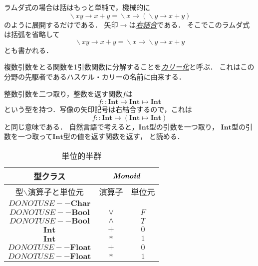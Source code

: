 \documentclass[a5paper,draft]{jsbook}
\newcommand{\keyword}[1]{{\underline{\emph{#1}}}}
\newcommand{\mathTypeParameter}[1]{\mathbf{#1}}
\newcommand{\mathTypeName}[1]{\mathbf{#1}}
\newcommand{\mathTypeClass}[1]{\textbf{\emph{#1}}} %
\DeclareMathOperator{\mathLambda}{\backslash}
\newcommand{\mathIn}{\mathrel{::}}
\newcommand{\mathLambdaArrow}{\rightarrow}
\newcommand{\mathMapsTo}{\mapsto}
\newcommand{\mathLambdaExpression}[2]{\mathLambda#1\mathLambdaArrow#2}
\newcommand{\mathMorphII}[3]{#1\mathMapsTo#2\mathMapsTo#3}
\newcommand{\mathMorphIIWithParenthesis}[3]{#1\mathMapsTo(#2\mathMapsTo#3)}
\newcommand{\hsklBool}{{DO NOT USE}--\mathTypeParameter{Bool}}
\newcommand{\hsklChar}{{DO NOT USE}--\mathTypeParameter{Char}}
\newcommand{\hsklFloat}{{DO NOT USE}--\mathTypeParameter{Float}}
\begin{document}
ラムダ式の場合は話はもっと単純で，機械的に
\begin{equation}
\mathLambdaExpression{xy}{x+y}
=\mathLambdaExpression{x}{\left(\mathLambdaExpression{y}{x+y}\right)}
\end{equation}
のように展開するだけである．
矢印$\mathLambdaArrow$は\keyword{右結合}である．
そこでこのラムダ式は括弧を省略して
\begin{equation}
\mathLambdaExpression{xy}{x+y}=\mathLambdaExpression{x}{\mathLambdaExpression{y}{x+y}}
\end{equation}
とも書かれる．

複数引数をとる関数を1引数関数に分解することを\keyword{カリー化}と呼ぶ．
これはこの分野の先駆者であるハスケル・カリーの名前に由来する．


整数引数を二つ取り，整数を返す関数$f$は
\begin{equation}
f\mathIn\mathMorphII{\mathTypeName{Int}}{\mathTypeName{Int}}{\mathTypeName{Int}}
\end{equation}
という型を持つ．写像の矢印記号は右結合するので，これは
\begin{equation}
f\mathIn\mathMorphIIWithParenthesis{\mathTypeName{Int}}{\mathTypeName{Int}}{\mathTypeName{Int}}
\end{equation}
と同じ意味である．
自然言語で考えると，$\mathTypeName{Int}$型の引数を一つ取り，
$\mathTypeName{Int}$型の引数を一つ取って$\mathTypeName{Int}$型の値を返す関数を返す，
と読める．

\begin{table}
\caption{単位的半群}
\label{tab:monoids}
\begin{center}
\begin{tabular}{||c||c|c||}
\hline
型クラス
    &\multicolumn{2}{|c||}{$\mathTypeClass{Monoid}$}\\
\hline\hline
型$\backslash$演算子と単位元
    &演算子
    &単位元\\
\hline
$\hsklChar$
    &
    &\\
\hline
$\hsklBool$
    &$\vee$
    &$F$\\
\hline
$\hsklBool$
    &$\wedge$
    &$T$\\
\hline
$\mathTypeName{Int}$
    &$+$
    &$0$\\
\hline
$\mathTypeName{Int}$
    &$*$
    &$1$\\
\hline
$\hsklFloat$
    &$+$
    &$0$\\
\hline
$\hsklFloat$
    &$*$
    &$1$\\
\hline
\end{tabular}
\end{center}
\end{table}
\end{document}
